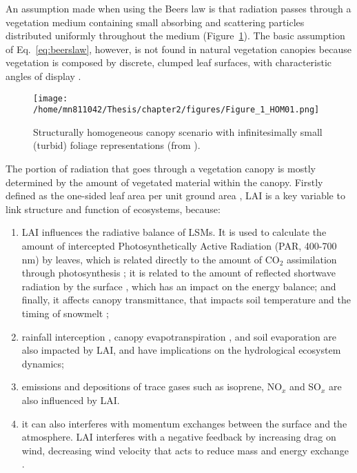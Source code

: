 An assumption made when using the Beer\textquotesingle s law is that radiation passes through a vegetation medium containing small absorbing and scattering particles distributed uniformly throughout the medium (Figure~\ref{f:homogeneous_canopy}). The basic assumption of Eq.~\ref{eq:beerslaw}, however, is not found in natural vegetation canopies because vegetation is composed by discrete, clumped leaf surfaces, with characteristic angles of display \citep{Sinclair2006}. 

\begin{figure}[ht!]
\centering
\texttt{[image: /home/mn811042/Thesis/chapter2/figures/Figure\_1\_HOM01.png]}
\caption{Structurally homogeneous canopy scenario with infinitesimally small (turbid) foliage representations (from \citet{Widlowski2007}).}
\label{f:homogeneous_canopy}
\end{figure}

The portion of radiation that goes through a vegetation canopy is mostly determined by the amount of vegetated material within the canopy. Firstly defined as the one-sided leaf area per unit ground area \citep{Watson1937}, LAI is a key variable to link structure and function of ecosystems, because:
\begin{enumerate}
\item LAI influences the radiative balance of LSMs. It is used to calculate the amount of intercepted Photosynthetically Active Radiation (PAR, 400-700 nm) by leaves, which is related directly to the amount of CO$_2$ assimilation through photosynthesis \citep{Norman1982,DePury1997}; it is related to the amount of reflected shortwave radiation by the surface \citep{Ni2000,Anderson2005}, which has an impact on the energy balance; and finally, it affects canopy transmittance, that impacts soil temperature and the timing of snowmelt \citep{Hardy1997};
\item rainfall interception \citep{Aston1979}, canopy evapotranspiration \citep{Leuning1995,Baldocchi2002}, and soil evaporation \citep{Schulze1994,Kelliher1995} are also impacted by LAI, and have implications on the hydrological ecosystem dynamics;
\item emissions and depositions of trace gases such as isoprene, NO$_x$ and SO$_x$ \citep{Hicks1987,Baldocchi1999} are also influenced by LAI.
\item it can also interferes with momentum exchanges between the surface and the atmosphere. LAI interferes with a negative feedback by increasing drag on wind, decreasing wind velocity that acts to reduce mass and energy exchange \citep{Albertson2001}.
\end{enumerate}

